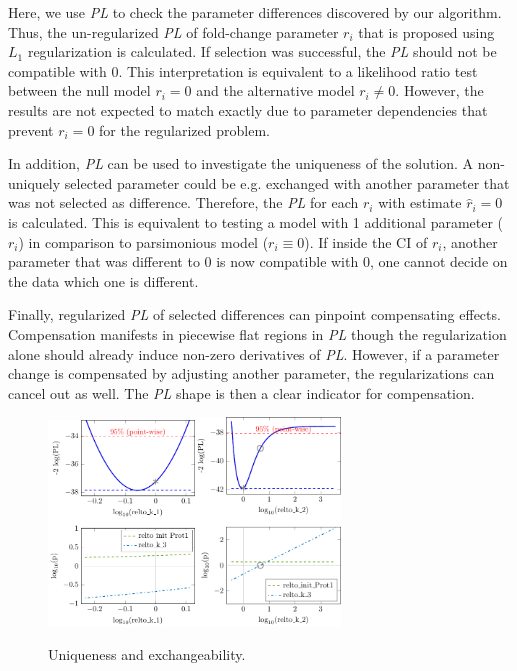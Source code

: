 \documentclass{bioinfo}
\begin{document}
Here, we use \emph{PL} to check the parameter differences discovered by our algorithm.
Thus, the un-regularized \emph{PL} of fold-change parameter $r_i$ that is proposed using $L_1$ regularization is calculated.
If selection was successful, the \emph{PL} should not be compatible with 0.
This interpretation is equivalent to a likelihood ratio test between the null model $r_i=0$ and the alternative model $r_i \neq 0$.
However, the results are not expected to match exactly due to parameter dependencies that prevent $r_i=0$ for the regularized problem.

In addition, \emph{PL} can be used to investigate the uniqueness of the solution.
A non-uniquely selected parameter could be e.g. exchanged with another parameter that was not selected as difference.
Therefore, the \emph{PL} for each $r_i$ with estimate $\hat r_i=0$ is calculated.
This is equivalent to testing a model with 1 additional parameter ($r_i$) in comparison to parsimonious model ($r_i \equiv 0$).
If inside the CI of $r_i$, another parameter that was different to $0$ is now compatible with $0$, one cannot decide on the data which one is different.

Finally, regularized \emph{PL} of selected differences can pinpoint compensating effects.
Compensation manifests in piecewise flat regions in \emph{PL} though the regularization alone should already induce non-zero derivatives of \emph{PL}.
However, if a parameter change is compensated by adjusting another parameter, the regularizations can cancel out as well.
The \emph{PL} shape is then a clear indicator for compensation.

\begin{figure}[!tpb]%
\centerline{\includegraphics[width=110pt]{Figures/relto_k_1.pdf}\includegraphics[width=110pt]{Figures/relto_k_2.pdf}}
\caption{Uniqueness and exchangeability.}\label{fig:01}
\end{figure}
\end{document}
